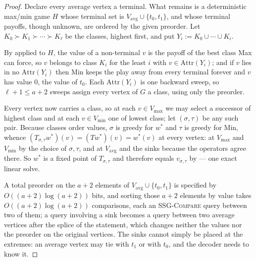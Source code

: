 \documentclass[11pt]{article}
\theoremstyle{plain}
\theoremstyle{definition}
\newcommand{\Vmax}{V_{\max}}
\newcommand{\Vmin}{V_{\min}}
\newcommand{\Vavg}{V_{\mathrm{avg}}}
\begin{document}
\begin{proof}
Declare every average vertex a terminal. What remains is a deterministic
max/min game $H$ whose terminal set is $\Vavg\cup\{t_0,t_1\}$, and whose
terminal payoffs, though unknown, are ordered by the given preorder. Let
$K_0\succ K_1\succ\cdots\succ K_\ell$ be the classes, highest first, and
put $Y_i:=K_0\cup\cdots\cup K_i$.

By  applied to $H$, the value of a non-terminal $v$ is
the payoff of the best class Max can force, so $v$ belongs to class $K_i$
for the least $i$ with $v\in\mathrm{Attr}(Y_i)$; and if $v$ lies in no
$\mathrm{Attr}(Y_i)$ then Min keeps the play away from every terminal
forever and $v$ has value $0$, the value of $t_0$. Each
$\mathrm{Attr}(Y_i)$ is one backward sweep, so $\ell+1\le a+2$ sweeps
assign every vertex of $G$ a class, using only the preorder.

Every vertex now carries a class, so at each $v\in\Vmax$ we may select a
successor of highest class and at each $v\in\Vmin$ one of lowest class;
let $(\sigma,\tau)$ be any such pair. Because classes order values,
$\sigma$ is greedy for $w^\ast$ and $\tau$ is greedy for Min, whence
$(T_{\sigma,\tau}w^\ast)(v)=(Tw^\ast)(v)=w^\ast(v)$ at every vertex: at
$\Vmax$ and $\Vmin$ by the choice of $\sigma,\tau$, and at $\Vavg$ and the
sinks because the operators agree there. So $w^\ast$ is a fixed point of
$T_{\sigma,\tau}$ and therefore equals $v_{\sigma,\tau}$ by
 --- one exact linear solve.

A total preorder on the $a+2$ elements of $\Vavg\cup\{t_0,t_1\}$ is
specified by $O((a+2)\log(a+2))$ bits, and sorting those $a+2$ elements by
value takes $O((a+2)\log(a+2))$ comparisons, each an \textsc{SSG-Compare}
query between two of them; a query involving a sink becomes a query
between two average vertices after the splice of the statement, which
changes neither the values nor the preorder on the original vertices. The
sinks cannot simply be placed at the extremes: an average vertex may tie
with $t_1$ or with $t_0$, and the decoder needs to know it.
\end{proof}
\end{document}
